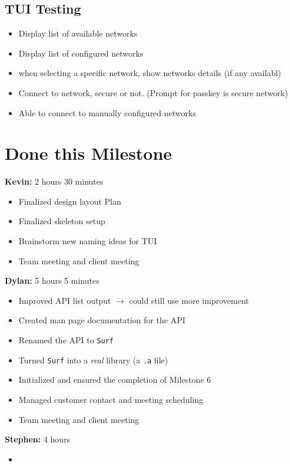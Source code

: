 \documentclass[11pt]{article}
\begin{document}
\subsection*{TUI Testing}
\begin{itemize}
  \item Display list of available networks
  \item Display list of configured networks
  \item when selecting a specific network, show networks details (if any availabl)
  \item Connect to network, secure or not. (Prompt for passkey is secure network)
  \item Able to connect to manually configured networks
\end{itemize}

\section*{Done this Milestone}

\textbf{Kevin:} 2 hours 30 minutes
\begin{itemize}
  \item Finalized design layout Plan
  \item Finalized skeleton setup
  \item Brainstorm new naming ideas for TUI
  \item Team meeting and client meeting
\end{itemize}

\textbf{Dylan:} 5 hours 5 minutes
\begin{itemize}
  \item Improved API list output $\rightarrow$ could still use more improvement
  \item Created man page documentation for the API
  \item Renamed the API to \texttt{Surf}
  \item Turned \texttt{Surf} into a \textit{real} library (a \texttt{.a} file)
  \item Initialized and ensured the completion of Milestone 6
  \item Managed customer contact and meeting scheduling
  \item Team meeting and client meeting
\end{itemize}

\textbf{Stephen:} 4 hours
\begin{itemize}
  \item
\end{itemize}
\end{document}
